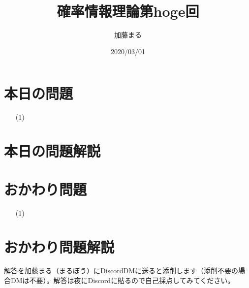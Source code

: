 \documentclass[a4j,uplatex]{jsarticle}
\title{確率情報理論第hoge回}
\author{加藤まる}
\date{2020/03/01}
\begin{document}
\maketitle

\section*{本日の問題}
\begin{itemize}
  \item[(1)]
\end{itemize}

\section*{本日の問題解説}

\section*{おかわり問題}
\begin{itemize}
  \item[(1)]
\end{itemize}

\section*{おかわり問題解説}

解答を加藤まる（まるぼう）にDiscordDMに送ると添削します（添削不要の場合DMは不要）。解答は夜にDiscordに貼るので自己採点してみてください。
\end{document}
